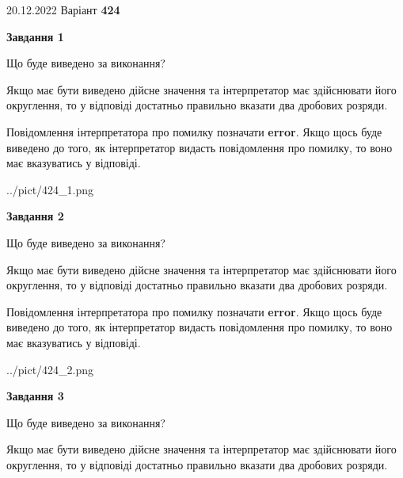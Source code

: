 \documentclass[12pt, ukrainian]{article}
\begin{document}
{20.12.2022 Варіант \No \textbf { 424 }\par}
{
\begin {Large}

{\begin {center}\textbf{Завдання 1}\end {center}}\par
Що буде виведено за виконання? \par

Якщо має бути виведено дійсне значення та інтерпретатор має здійснювати його округлення, 
то у відповіді достатньо правильно вказати два дробових розряди.

Повідомлення інтерпретатора про помилку позначати \textbf{error}.
Якщо щось буде виведено до того, як інтерпретатор видасть повідомлення про помилку, 
то воно має вказуватись у відповіді. \par

\begin{center}
	{../pict/424_1.png}
\end{center}
\newpage

{\begin {center}\textbf{Завдання 2}\end {center}}\par
Що буде виведено за виконання? \par

Якщо має бути виведено дійсне значення та інтерпретатор має здійснювати його округлення, 
то у відповіді достатньо правильно вказати два дробових розряди.

Повідомлення інтерпретатора про помилку позначати \textbf{error}.
Якщо щось буде виведено до того, як інтерпретатор видасть повідомлення про помилку, 
то воно має вказуватись у відповіді. \par

\begin{center}
	{../pict/424_2.png}
\end{center}
\newpage

{\begin {center}\textbf{Завдання 3}\end {center}}\par
Що буде виведено за виконання? \par

Якщо має бути виведено дійсне значення та інтерпретатор має здійснювати його округлення, 
то у відповіді достатньо правильно вказати два дробових розряди.


\end{Large}}
\end{document}

